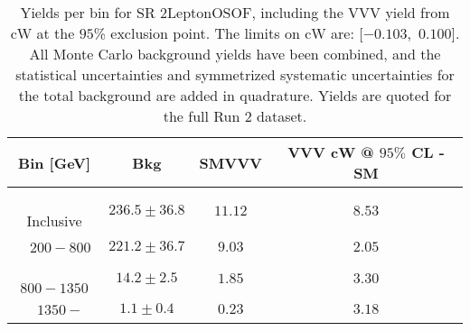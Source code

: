 \begin{table}[!htbp]
    \small
    \center
    \begin{tabular}{c||c|c|c}
    Bin [GeV] & Bkg & SMVVV & \pbox{20cm}{VVV \\ cW @ $95\%$ CL - SM \\ }\\
    \hline
    \pbox{20cm}{ ~ \\Inclusive\\ } & $236.5 \pm 36.8$ & $11.12$ & $8.53$\\
    \hline
    \pbox{20cm}{ ~ \\$200-800$\\ } & $221.2 \pm 36.7$ & $9.03$ & $2.05$\\
    \hline
    \pbox{20cm}{ ~ \\$800-1350$\\ } & $14.2 \pm 2.5$ & $1.85$ & $3.30$\\
    \hline
    \pbox{20cm}{ ~ \\$1350-$\\ } & $1.1 \pm 0.4$ & $0.23$ & $3.18$\\
\end{tabular}
    \caption{Yields per bin for SR 2LeptonOSOF, including the VVV yield from cW at the $95$\% exclusion point. The limits on cW are: [$-0.103$,~$0.100$]. All Monte Carlo background yields have been combined, and the statistical uncertainties and symmetrized systematic uncertainties for the total background are added in quadrature. Yields are quoted for the full Run 2 dataset.}
    \label{tab:2LeptonOSOF$binssignal}
\end{table}
